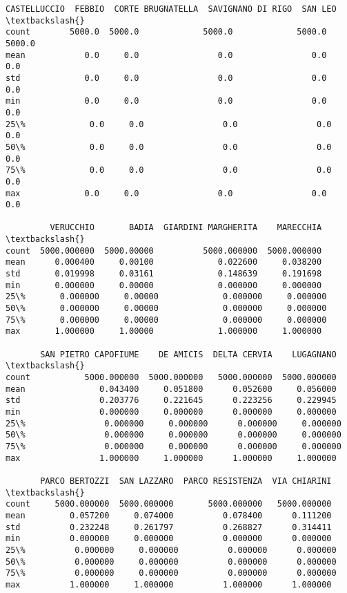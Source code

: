 \documentclass[11pt]{article}
\makeatletter
\newcommand{\boxspacing}{\kern\kvtcb@left@rule\kern\kvtcb@boxsep}
\newcommand{\prompt}[4]{
        {\ttfamily\llap{{\color{#2}[#3]:\hspace{3pt}#4}}\vspace{-\baselineskip}}
    }
\makeatother
\begin{document}
            \begin{tcolorbox}[breakable, size=fbox, boxrule=.5pt, pad at break*=1mm, opacityfill=0]
\prompt{Out}{outcolor}{23}{\boxspacing}
\begin{Verbatim}[commandchars=\\\{\}]
       CASTELLUCCIO  FEBBIO  CORTE BRUGNATELLA  SAVIGNANO DI RIGO  SAN LEO  \textbackslash{}
count        5000.0  5000.0             5000.0             5000.0   5000.0
mean            0.0     0.0                0.0                0.0      0.0
std             0.0     0.0                0.0                0.0      0.0
min             0.0     0.0                0.0                0.0      0.0
25\%             0.0     0.0                0.0                0.0      0.0
50\%             0.0     0.0                0.0                0.0      0.0
75\%             0.0     0.0                0.0                0.0      0.0
max             0.0     0.0                0.0                0.0      0.0

         VERUCCHIO       BADIA  GIARDINI MARGHERITA    MARECCHIA  \textbackslash{}
count  5000.000000  5000.00000          5000.000000  5000.000000
mean      0.000400     0.00100             0.022600     0.038200
std       0.019998     0.03161             0.148639     0.191698
min       0.000000     0.00000             0.000000     0.000000
25\%       0.000000     0.00000             0.000000     0.000000
50\%       0.000000     0.00000             0.000000     0.000000
75\%       0.000000     0.00000             0.000000     0.000000
max       1.000000     1.00000             1.000000     1.000000

       SAN PIETRO CAPOFIUME    DE AMICIS  DELTA CERVIA    LUGAGNANO  \textbackslash{}
count           5000.000000  5000.000000   5000.000000  5000.000000
mean               0.043400     0.051800      0.052600     0.056000
std                0.203776     0.221645      0.223256     0.229945
min                0.000000     0.000000      0.000000     0.000000
25\%                0.000000     0.000000      0.000000     0.000000
50\%                0.000000     0.000000      0.000000     0.000000
75\%                0.000000     0.000000      0.000000     0.000000
max                1.000000     1.000000      1.000000     1.000000

       PARCO BERTOZZI  SAN LAZZARO  PARCO RESISTENZA  VIA CHIARINI  \textbackslash{}
count     5000.000000  5000.000000       5000.000000   5000.000000
mean         0.057200     0.074000          0.078400      0.111200
std          0.232248     0.261797          0.268827      0.314411
min          0.000000     0.000000          0.000000      0.000000
25\%          0.000000     0.000000          0.000000      0.000000
50\%          0.000000     0.000000          0.000000      0.000000
75\%          0.000000     0.000000          0.000000      0.000000
max          1.000000     1.000000          1.000000      1.000000


\end{Verbatim}
\end{tcolorbox}
\end{document}
